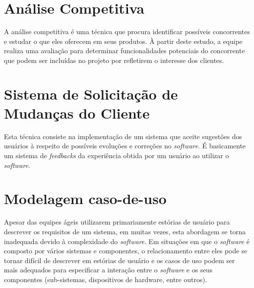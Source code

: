 \section{Análise Competitiva}
A análise competitiva é uma técnica que procura identificar possíveis concorrentes e estudar o que eles oferecem em seus produtos. À partir deste estudo, a equipe realiza uma avaliação para determinar funcionalidades potenciais do concorrente que podem ser incluídas no projeto por refletirem o interesse dos clientes.

\section{Sistema de Solicitação de Mudanças do Cliente}
Esta técnica consiste na implementação de um sistema que aceite sugestões dos usuários à respeito de possíveis evoluções e correções no \emph{software}. É basicamente um sistema de \emph{feedbacks} da experiência obtida por um usuário ao utilizar o \emph{software}.

\section{Modelagem caso-de-uso}
Apesar das equipes ágeis utilizarem primariamente estórias de usuário para descrever os requisitos de um sistema, em muitas vezes, esta abordagem se torna inadequada devido à complexidade do \emph{software}. Em situações em que o \emph{software} é composto por vários sistemas e componentes, o relacionamento entre eles pode se tornar difícil de descrever em estórias de usuário e os casos de uso podem ser mais adequados para especificar a interação entre o \emph{software} e os seus componentes (sub-sistemas, dispositivos de hardware, entre outros).

